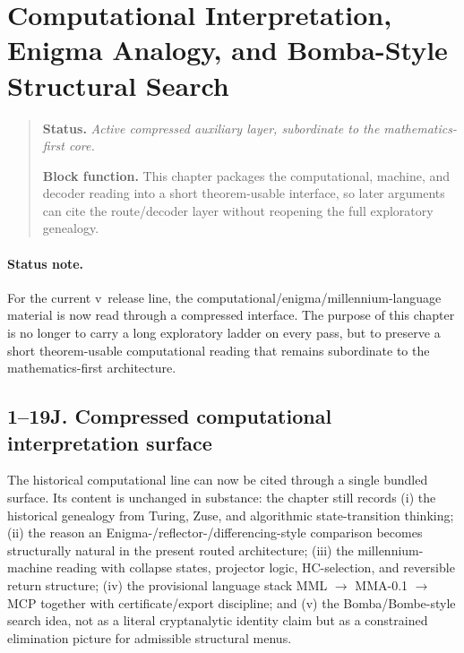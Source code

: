 \section{Computational Interpretation, Enigma Analogy, and Bomba-Style Structural Search}
\begin{quote}\small
\noindent\textbf{Status.} \emph{Active compressed auxiliary layer, subordinate to the mathematics-first core.}\par
\noindent\textbf{Block function.} This chapter packages the computational, machine, and decoder reading into a short theorem-usable interface, so later arguments can cite the route/decoder layer without reopening the full exploratory genealogy.
\end{quote}
\label{sec:computational-reading}

\paragraph{Status note.}
For the current v\docversion\ release line, the computational/enigma/millennium-language material is now read through a compressed interface. The purpose of this chapter is no longer to carry a long exploratory ladder on every pass, but to preserve a short theorem-usable computational reading that remains subordinate to the mathematics-first architecture.

\subsection*{1--19J. Compressed computational interpretation surface}
The historical computational line can now be cited through a single bundled surface. Its content is unchanged in substance: the chapter still records (i) the historical genealogy from Turing, Zuse, and algorithmic state-transition thinking; (ii) the reason an Enigma-/reflector-/differencing-style comparison becomes structurally natural in the present routed architecture; (iii) the millennium-machine reading with collapse states, projector logic, HC-selection, and reversible return structure; (iv) the provisional language stack MML $\to$ MMA-0.1 $\to$ MCP together with certificate/export discipline; and (v) the Bomba/Bombe-style search idea, not as a literal cryptanalytic identity claim but as a constrained elimination picture for admissible structural menus.

